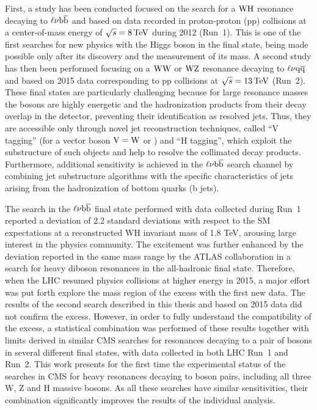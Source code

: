 First, a study has been conducted focused on the search for a $\mathrm{W}\mathrm{H}$ resonance decaying to $\ell\nu{\mathrm{b}\overline{\mathrm{b}}}$ and based on data recorded in proton-proton (pp) collisions at a center-of-mass energy of $\sqrt{s} = 8\,\text{Te\hspace{-.08em}V}$ during 2012 (Run~1). This is one of the first searches for new physics with the Higgs boson in the final state, being made possible only after its discovery and the measurement of its mass.
A second study has then been performed focusing on a $\mathrm{W}\mathrm{W}$ or $\mathrm{W}\mathrm{Z}$ resonance decaying to $\ell\nu\mathrm{q}\overline{\mathrm{q}}$ and based on 2015 data corresponding to pp collisions at $\sqrt{s} = 13\,\text{Te\hspace{-.08em}V}$ (Run~2).
These final states are particularly challenging because for large resonance masses the bosons are highly energetic and the hadronization products from their decay overlap in the detector, preventing their identification as resolved jets.
Thus, they are accessible only through novel jet reconstruction techniques, called ``V tagging'' (for a vector boson $\mathrm{V} = \mathrm{W}$ or \PZ) and ``H tagging'', which exploit the substructure of such objects and help to resolve the collimated decay products.
Furthermore, additional sensitivity is achieved in the $\ell\nu{\mathrm{b}\overline{\mathrm{b}}}$ search channel by combining jet substructure algorithms with the specific characteristics of jets arising from the hadronization of bottom quarks (b jets).

The search in the $\ell\nu{\mathrm{b}\overline{\mathrm{b}}}$ final state performed with data collected during Run~1 reported a deviation of 2.2 standard deviations with respect to the SM expectations at a reconstructed WH invariant mass of 1.8 TeV, arousing large interest in the physics community. The excitement was further enhanced by the deviation reported in the same mass range by the ATLAS collaboration in a search for heavy diboson resonances in the all-hadronic final state. 
Therefore, when the LHC resumed physics collisions at higher energy in 2015, a major effort was put forth explore the mass region of the excess with the first new data. The results of the second search described in this thesis and based on 2015 data did not confirm the excess. However, in order to fully understand the compatibility of the excess, a statistical combination was performed of these results together with limits derived in similar CMS searches for resonances decaying to a pair of bosons in several different final states, with data collected in both LHC Run~1 and Run~2.
This work presents for the first time the experimental status of the searches in CMS for heavy resonances decaying to boson pairs, including all three W, Z and H massive bosons.
As all these searches have similar sensitivities, their combination significantly improves the results of the individual analysis.

